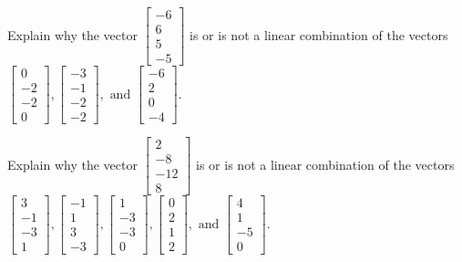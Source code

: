 \documentclass{article}
\begin{document}
\begin{exerciseStatement}
    Explain why the vector \(\left[\begin{array}{c}
-6 \\
6 \\
5 \\
-5
\end{array}\right]\)  is or is not a linear
combination of the vectors \(\left[\begin{array}{c}
0 \\
-2 \\
-2 \\
0
\end{array}\right] , \left[\begin{array}{c}
-3 \\
-1 \\
-2 \\
-2
\end{array}\right] , \text{ and } \left[\begin{array}{c}
-6 \\
2 \\
0 \\
-4
\end{array}\right]\).



  
\end{exerciseStatement}

\begin{exerciseStatement}
    Explain why the vector \(\left[\begin{array}{c}
2 \\
-8 \\
-12 \\
8
\end{array}\right]\)  is or is not a linear
combination of the vectors \(\left[\begin{array}{c}
3 \\
-1 \\
-3 \\
1
\end{array}\right] , \left[\begin{array}{c}
-1 \\
1 \\
3 \\
-3
\end{array}\right] , \left[\begin{array}{c}
1 \\
-3 \\
-3 \\
0
\end{array}\right] , \left[\begin{array}{c}
0 \\
2 \\
1 \\
2
\end{array}\right] , \text{ and } \left[\begin{array}{c}
4 \\
1 \\
-5 \\
0
\end{array}\right]\).



  
\end{exerciseStatement}
\end{document}
